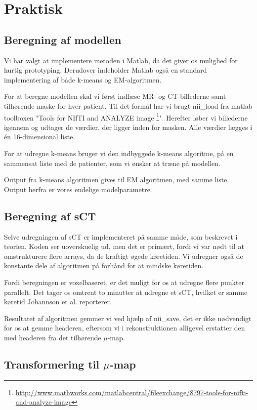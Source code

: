 \section{Praktisk}

\subsection{Beregning af modellen}

Vi har valgt at implementere metoden i Matlab, da det giver os mulighed
for hurtig prototyping. Derudover indeholder Matlab også en standard
implementering af både k-means og EM-algoritmen.

For at beregne modellen skal vi først indlæse MR- og CT-billederne
samt tilhørende maske for hver patient. Til det formål har vi brugt
nii\_load fra matlab toolboxen "Tools for NIfTI and ANALYZE
image \footnote{\url{http://www.mathworks.com/matlabcentral/fileexchange/8797-tools-for-nifti-and-analyze-image}}".
Herefter løber vi billederne igennem og udtager de værdier, der ligger
inden for masken. Alle værdier lægges i én 16-dimensional liste.

For at udregne k-means bruger vi den indbyggede k-means algoritme, på
en sammensat liste med de patienter, som vi ønsker at træne på
modellen.

Output fra k-means algoritmen gives til EM algoritmen, med samme liste. Output herfra er vores endelige modelparametre.

\subsection{Beregning af sCT}

Selve udregningen af sCT er implementeret på samme måde, som beskrevet i
teorien. Koden ser uoverskuelig ud, men det er primært, fordi
vi var nødt til at omstrukturere flere arrays, da de kraftigt øgede køretiden. Vi udregner også de konstante dele
af algoritmen på forhånd for at mindske køretiden.

Fordi beregningen er voxelbaseret, er det muligt for os at udregne flere
punkter parallelt. Det tager os omtrent to minutter at udregne et sCT,
hvilket er samme køretid Johannson et al. reporterer.

Resultatet af algoritmen gemmer vi ved hjælp af nii\_save, det er ikke
nødvendigt for os at gemme headeren, eftersom vi i rekonstruktionen
alligevel erstatter den med headeren fra det tilhørende $\mu$-map.

\subsection{Transformering til \texorpdfstring{$\mu$}{u}-map} 


